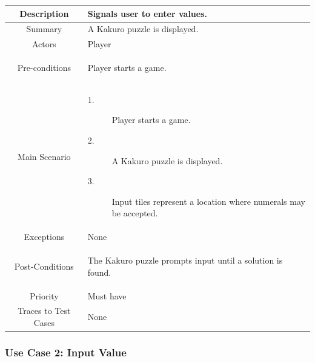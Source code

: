 \documentclass[12pt]{article}
\begin{document}
\begin{table}[htbp]
\begin{center}
\begin{tabular}{| c | m{10cm} |}
\hline
\cellcolor{lightgray}Description & Signals user to enter values. \\
\hline
\cellcolor{lightgray}Summary & A Kakuro puzzle is displayed. \\
\hline
\cellcolor{lightgray}Actors & Player \\
\hline
\cellcolor{lightgray}Pre-conditions &
\begin{description}[font=$\bullet$~\normalfont\scshape]
\item Player starts a game.
\end{description}\\
\hline
\cellcolor{lightgray}Main Scenario & 
\begin{description}
\item [1.]Player starts a game.
\item [2.]A Kakuro puzzle is displayed. 
\item [3.]Input tiles represent a location where numerals may be accepted.
\end{description}\\
\hline
\cellcolor{lightgray}Exceptions & None \\
\hline
\cellcolor{lightgray}Post-Conditions & 
\begin{description}[font=$\bullet$~\normalfont\scshape]
\item The Kakuro puzzle prompts input until a solution is found.
\end{description}\\
\hline
\cellcolor{lightgray}Priority & Must have \\
\hline
\cellcolor{lightgray}Traces to Test Cases & None \\
\hline
\end{tabular}
\end{center}
\end{table}

\clearpage
\subsubsection{Use Case 2: Input Value} \label{uc:1}
\end{document}
